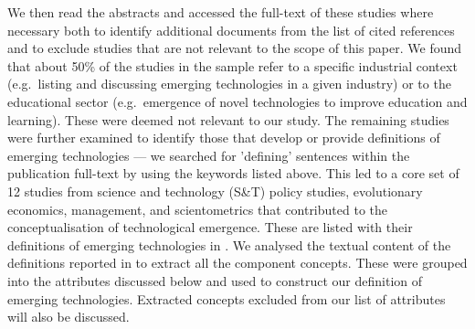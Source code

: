 \documentclass[11pt]{article}
\begin{document}
We then read the abstracts and accessed the full-text of these studies where necessary both to identify additional documents from the list of cited references and to exclude studies that are not relevant to the scope of this paper.  We found that about 50\% of the studies in the sample refer to a specific industrial context (e.g.\ listing and discussing emerging technologies in a given industry) or to the educational sector (e.g.\ emergence of novel technologies to improve education and learning). These were deemed not relevant to our study. The remaining studies were further examined to identify those that develop or provide definitions of emerging technologies --- we searched for 'defining' sentences within the publication full-text by using the keywords listed above. This led to a core set of 12 studies from science and technology (S\&T) policy studies, evolutionary economics, management, and scientometrics that contributed to the conceptualisation of technological emergence. These are listed with their definitions of emerging technologies in . We analysed the textual content of the definitions reported in  to extract all the component concepts. These were grouped into the attributes discussed below and used to construct our definition of emerging technologies. Extracted concepts excluded from our list of attributes will also be discussed.
\end{document}
